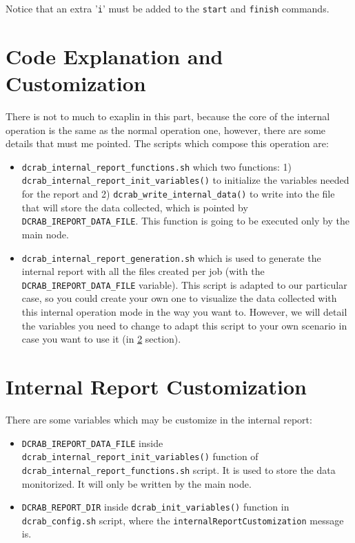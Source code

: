 \documentclass[10pt,a4paper]{report}
\begin{document}
Notice that an extra '\verb+i+' must be added to the \verb+start+ and \verb+finish+ commands.

\section{Code Explanation and Customization}

There is not to much to exaplin in this part, because the core of the internal operation is the same as the normal operation one, however, there are some details that must me pointed. The scripts which compose this operation are:

\begin{itemize}
  \item \verb+dcrab_internal_report_functions.sh+ which two functions: 1) \texttt{dcrab\_internal\_report\_init\_variables()} to initialize the variables needed for the report and 2) \texttt{dcrab\_write\_internal\_data()} to write into the file that will store the data collected, which is pointed by \verb+DCRAB_IREPORT_DATA_FILE+. This function is going to be executed only by the main node.
  \item \verb+dcrab_internal_report_generation.sh+ which is used to generate the internal report with all the files created per job (with the \verb+DCRAB_IREPORT_DATA_FILE+ variable). This script is adapted to our particular case, so you could create your own one to visualize the data collected with this internal operation mode in the way you want to. However, we will detail the variables you need to change to adapt this script to your own scenario in case you want to use it (in \ref{internalReportCustomization} section).
\end{itemize}

\section{Internal Report Customization}
\label{internalReportCustomization}

There are some variables which may be customize in the internal report:

\begin{itemize}
  \item \texttt{DCRAB\_IREPORT\_DATA\_FILE} inside \texttt{dcrab\_internal\_report\_init\_variables()} function of \verb+dcrab_internal_report_functions.sh+ script. It is used to store the data monitorized. It will only be written by the main node.
  \item \texttt{DCRAB\_REPORT\_DIR} inside \texttt{dcrab\_init\_variables()} function in \verb+dcrab_config.sh+ script, where the \verb+internalReportCustomization+ message is.
\end{itemize}
\end{document}
